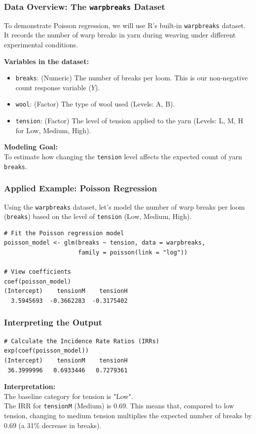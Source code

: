 \documentclass[10pt]{beamer} %
\begin{document}
\begin{frame}
    \frametitle{Data Overview: The \texttt{warpbreaks} Dataset}
    To demonstrate Poisson regression, we will use R's built-in
    \texttt{warpbreaks} dataset. It records the number of warp breaks in yarn
    during weaving under different experimental conditions.
    
    \vspace{0.5cm}
    \textbf{Variables in the dataset:}
    \begin{itemize}
        \item \texttt{breaks}: (Numeric) The number of breaks per loom. This is
           our non-negative count response variable ($Y$).
        \item \texttt{wool}: (Factor) The type of wool used (Levels: A, B).
        \item \texttt{tension}: (Factor) The level of tension applied to the
           yarn (Levels: L, M, H for Low, Medium, High).
    \end{itemize}
    
    \vspace{0.5cm}
    \textbf{Modeling Goal:} \\
    To estimate how changing the \texttt{tension} level affects the expected count of yarn \texttt{breaks}.
\end{frame}

\begin{frame}[fragile]
    \frametitle{Applied Example: Poisson Regression}
    Using the \texttt{warpbreaks} dataset, let's model the number of warp breaks per loom (\texttt{breaks}) based on the level of \texttt{tension} (Low, Medium, High).
    
\begin{verbatim}
# Fit the Poisson regression model
poisson_model <- glm(breaks ~ tension, data = warpbreaks, 
                     family = poisson(link = "log"))

# View coefficients
coef(poisson_model)
(Intercept)    tensionM    tensionH 
  3.5945693  -0.3662283  -0.3175402 
\end{verbatim}
\end{frame}

\begin{frame}[fragile]
    \frametitle{Interpreting the Output}
\begin{verbatim}
# Calculate the Incidence Rate Ratios (IRRs)
exp(coef(poisson_model))
(Intercept)    tensionM    tensionH 
 36.3999996   0.6933446   0.7279361 
\end{verbatim}

    \vspace{0.5cm}
    \textbf{Interpretation:}\\
    The baseline category for tension is "Low". \\
    \vspace{0.2cm}
    The IRR for \texttt{tensionM} (Medium) is 0.69. This means that, compared to low tension, changing to medium tension multiplies the expected number of breaks by 0.69 (a 31\% decrease in breaks).
\end{frame}
\end{document}
